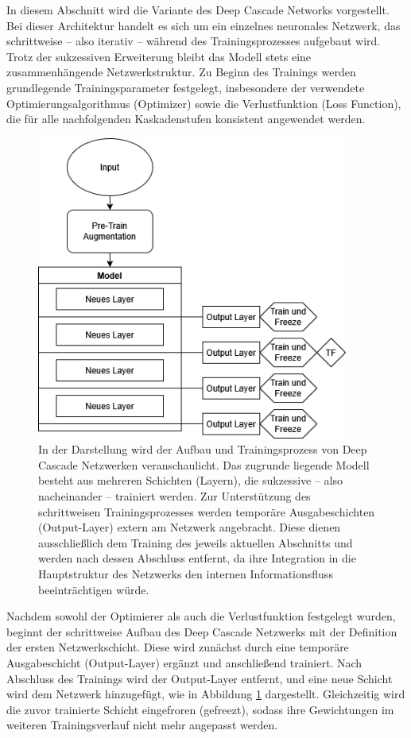 In diesem Abschnitt wird die Variante des Deep Cascade Networks vorgestellt. Bei dieser Architektur handelt es sich um ein einzelnes neuronales 
Netzwerk, das schrittweise – also iterativ – während des Trainingsprozesses aufgebaut wird. Trotz der sukzessiven Erweiterung bleibt das Modell 
stets eine zusammenhängende Netzwerkstruktur. Zu Beginn des Trainings werden grundlegende Trainingsparameter festgelegt, insbesondere der 
verwendete Optimierungsalgorithmus (Optimizer) sowie die Verlustfunktion (Loss Function), die für alle nachfolgenden Kaskadenstufen konsistent 
angewendet werden.

\begin{figure}[htpb]
    \centering
    \includegraphics[height=10cm]{../../Graphiken/deepcascade_2.png}
    \caption{\label{fig:deepcascade}
    \small{In der Darstellung wird der Aufbau und Trainingsprozess von Deep Cascade Netzwerken veranschaulicht. Das zugrunde liegende Modell 
    besteht aus mehreren Schichten (Layern), die sukzessive – also nacheinander – trainiert werden. Zur Unterstützung des schrittweisen 
    Trainingsprozesses werden temporäre Ausgabeschichten (Output-Layer) extern am Netzwerk angebracht. Diese dienen ausschließlich dem Training 
    des jeweils aktuellen Abschnitts und werden nach dessen Abschluss entfernt, da ihre Integration in die Hauptstruktur des Netzwerks den 
    internen Informationsfluss beeinträchtigen würde.}}
\end{figure}

Nachdem sowohl der Optimierer als auch die Verlustfunktion festgelegt wurden, beginnt der schrittweise Aufbau des Deep Cascade Netzwerks mit der 
Definition der ersten Netzwerkschicht. Diese wird zunächst durch eine temporäre Ausgabeschicht (Output-Layer) ergänzt und anschließend trainiert. 
Nach Abschluss des Trainings wird der Output-Layer entfernt, und eine neue Schicht wird dem Netzwerk hinzugefügt, wie in Abbildung 
\ref{fig:deepcascade} dargestellt. Gleichzeitig wird die zuvor trainierte Schicht eingefroren (gefreezt), sodass ihre Gewichtungen im weiteren 
Trainingsverlauf nicht mehr angepasst werden.

